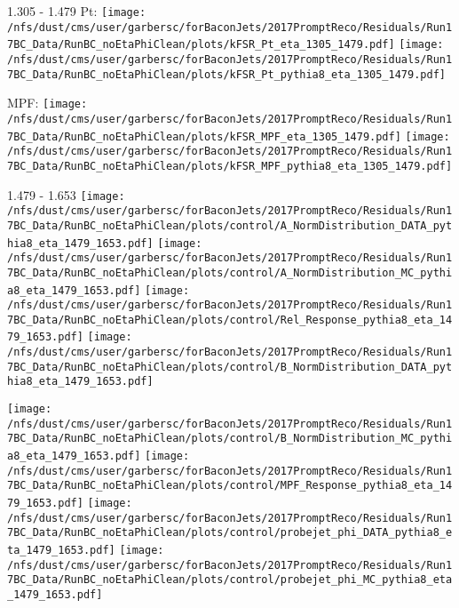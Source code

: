 \documentclass[t,compress]{beamer}
\begin{document}
\begin{frame}{1.305 - 1.479}
	 Pt: \texttt{[image: /nfs/dust/cms/user/garbersc/forBaconJets/2017PromptReco/Residuals/Run17BC\_Data/RunBC\_noEtaPhiClean/plots/kFSR\_Pt\_eta\_1305\_1479.pdf]}
	\texttt{[image: /nfs/dust/cms/user/garbersc/forBaconJets/2017PromptReco/Residuals/Run17BC\_Data/RunBC\_noEtaPhiClean/plots/kFSR\_Pt\_pythia8\_eta\_1305\_1479.pdf]}
\newline

	 MPF: \texttt{[image: /nfs/dust/cms/user/garbersc/forBaconJets/2017PromptReco/Residuals/Run17BC\_Data/RunBC\_noEtaPhiClean/plots/kFSR\_MPF\_eta\_1305\_1479.pdf]}
	\texttt{[image: /nfs/dust/cms/user/garbersc/forBaconJets/2017PromptReco/Residuals/Run17BC\_Data/RunBC\_noEtaPhiClean/plots/kFSR\_MPF\_pythia8\_eta\_1305\_1479.pdf]}
\end{frame}

\begin{frame}{1.479 - 1.653}
	\texttt{[image: /nfs/dust/cms/user/garbersc/forBaconJets/2017PromptReco/Residuals/Run17BC\_Data/RunBC\_noEtaPhiClean/plots/control/A\_NormDistribution\_DATA\_pythia8\_eta\_1479\_1653.pdf]}
	\texttt{[image: /nfs/dust/cms/user/garbersc/forBaconJets/2017PromptReco/Residuals/Run17BC\_Data/RunBC\_noEtaPhiClean/plots/control/A\_NormDistribution\_MC\_pythia8\_eta\_1479\_1653.pdf]}
	\texttt{[image: /nfs/dust/cms/user/garbersc/forBaconJets/2017PromptReco/Residuals/Run17BC\_Data/RunBC\_noEtaPhiClean/plots/control/Rel\_Response\_pythia8\_eta\_1479\_1653.pdf]}
	\texttt{[image: /nfs/dust/cms/user/garbersc/forBaconJets/2017PromptReco/Residuals/Run17BC\_Data/RunBC\_noEtaPhiClean/plots/control/B\_NormDistribution\_DATA\_pythia8\_eta\_1479\_1653.pdf]}
\newline

	\texttt{[image: /nfs/dust/cms/user/garbersc/forBaconJets/2017PromptReco/Residuals/Run17BC\_Data/RunBC\_noEtaPhiClean/plots/control/B\_NormDistribution\_MC\_pythia8\_eta\_1479\_1653.pdf]}
	\texttt{[image: /nfs/dust/cms/user/garbersc/forBaconJets/2017PromptReco/Residuals/Run17BC\_Data/RunBC\_noEtaPhiClean/plots/control/MPF\_Response\_pythia8\_eta\_1479\_1653.pdf]}
	\texttt{[image: /nfs/dust/cms/user/garbersc/forBaconJets/2017PromptReco/Residuals/Run17BC\_Data/RunBC\_noEtaPhiClean/plots/control/probejet\_phi\_DATA\_pythia8\_eta\_1479\_1653.pdf]}
	\texttt{[image: /nfs/dust/cms/user/garbersc/forBaconJets/2017PromptReco/Residuals/Run17BC\_Data/RunBC\_noEtaPhiClean/plots/control/probejet\_phi\_MC\_pythia8\_eta\_1479\_1653.pdf]}
\end{frame}
\end{document}
